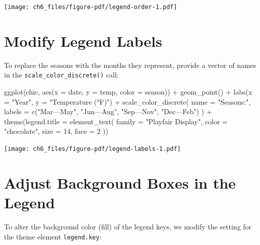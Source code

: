 \documentclass[
  letterpaper,
]{scrbook}
\newenvironment{Shaded}{\begin{snugshade}}{\end{snugshade}}
\newcommand{\AttributeTok}[1]{\textcolor[rgb]{0.40,0.45,0.13}{#1}}
\newcommand{\DecValTok}[1]{\textcolor[rgb]{0.68,0.00,0.00}{#1}}
\newcommand{\FunctionTok}[1]{\textcolor[rgb]{0.28,0.35,0.67}{#1}}
\newcommand{\NormalTok}[1]{\textcolor[rgb]{0.00,0.23,0.31}{#1}}
\newcommand{\SpecialCharTok}[1]{\textcolor[rgb]{0.37,0.37,0.37}{#1}}
\newcommand{\StringTok}[1]{\textcolor[rgb]{0.13,0.47,0.30}{#1}}
\begin{document}
\texttt{[image: ch6\_files/figure-pdf/legend-order-1.pdf]}

\section{Modify Legend Labels}\label{modify-legend-labels}

To replace the seasons with the months they represent, provide a vector
of names in the \texttt{scale\_color\_discrete()} call:

\begin{Shaded}
\begin{Highlighting}[]
\FunctionTok{ggplot}\NormalTok{(chic, }\FunctionTok{aes}\NormalTok{(}\AttributeTok{x =}\NormalTok{ date, }\AttributeTok{y =}\NormalTok{ temp, }\AttributeTok{color =}\NormalTok{ season)) }\SpecialCharTok{+}
  \FunctionTok{geom\_point}\NormalTok{() }\SpecialCharTok{+}
  \FunctionTok{labs}\NormalTok{(}\AttributeTok{x =} \StringTok{"Year"}\NormalTok{, }\AttributeTok{y =} \StringTok{"Temperature (°F)"}\NormalTok{) }\SpecialCharTok{+}
  \FunctionTok{scale\_color\_discrete}\NormalTok{(}
    \AttributeTok{name =} \StringTok{"Seasons:"}\NormalTok{,}
    \AttributeTok{labels =} \FunctionTok{c}\NormalTok{(}\StringTok{"Mar—May"}\NormalTok{, }\StringTok{"Jun—Aug"}\NormalTok{, }\StringTok{"Sep—Nov"}\NormalTok{, }\StringTok{"Dec—Feb"}\NormalTok{)}
\NormalTok{  ) }\SpecialCharTok{+}
  \FunctionTok{theme}\NormalTok{(}\AttributeTok{legend.title =} \FunctionTok{element\_text}\NormalTok{(}
    \AttributeTok{family =} \StringTok{"Playfair Display"}\NormalTok{, }\AttributeTok{color =} \StringTok{"chocolate"}\NormalTok{, }\AttributeTok{size =} \DecValTok{14}\NormalTok{, }\AttributeTok{face =} \DecValTok{2}
\NormalTok{  ))}
\end{Highlighting}
\end{Shaded}

\texttt{[image: ch6\_files/figure-pdf/legend-labels-1.pdf]}

\section{Adjust Background Boxes in the
Legend}\label{adjust-background-boxes-in-the-legend}

To alter the background color (fill) of the legend keys, we modify the
setting for the theme element \texttt{legend.key}:
\end{document}
